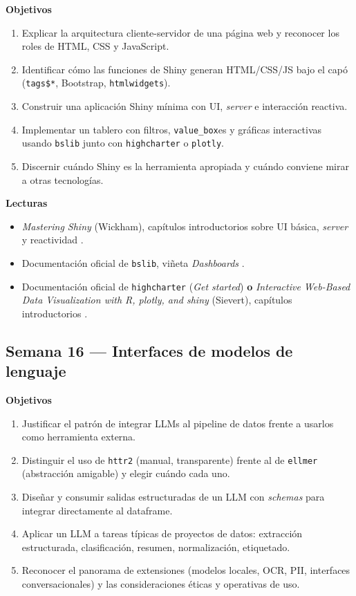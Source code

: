 \documentclass[11pt,letterpaper]{article}
\newcommand{\semanaSucinta}[2]{%
  \subsection*{\color{main}Semana #1 --- #2}%
}
\begin{document}
\noindent\textbf{Objetivos}
\begin{enumerate}[leftmargin=*, itemsep=1pt]
    \item Explicar la arquitectura cliente-servidor de una página web y reconocer los roles de HTML, CSS y JavaScript.
    \item Identificar cómo las funciones de Shiny generan HTML/CSS/JS bajo el capó (\texttt{tags\$*}, Bootstrap, \texttt{htmlwidgets}).
    \item Construir una aplicación Shiny mínima con UI, \textit{server} e interacción reactiva.
    \item Implementar un tablero con filtros, \texttt{value\_box}es y gráficas interactivas usando \texttt{bslib} junto con \texttt{highcharter} o \texttt{plotly}.
    \item Discernir cuándo Shiny es la herramienta apropiada y cuándo conviene mirar a otras tecnologías.
\end{enumerate}

\noindent\textbf{Lecturas}
\begin{itemize}[leftmargin=*, itemsep=1pt]
    \item \textit{Mastering Shiny} (Wickham), capítulos introductorios sobre UI básica, \textit{server} y reactividad \cite{wickham2021mastering-shiny}.
    \item Documentación oficial de \texttt{bslib}, viñeta \textit{Dashboards} \cite{bslib-docs}.
    \item Documentación oficial de \texttt{highcharter} (\textit{Get started}) \cite{kunst-highcharter} \textbf{o} \textit{Interactive Web-Based Data Visualization with R, plotly, and shiny} (Sievert), capítulos introductorios \cite{sievert-plotly}.
\end{itemize}

\semanaSucinta{16}{Interfaces de modelos de lenguaje}

\noindent\textbf{Objetivos}
\begin{enumerate}[leftmargin=*, itemsep=1pt]
    \item Justificar el patrón de integrar LLMs al pipeline de datos frente a usarlos como herramienta externa.
    \item Distinguir el uso de \texttt{httr2} (manual, transparente) frente al de \texttt{ellmer} (abstracción amigable) y elegir cuándo cada uno.
    \item Diseñar y consumir salidas estructuradas de un LLM con \textit{schemas} para integrar directamente al dataframe.
    \item Aplicar un LLM a tareas típicas de proyectos de datos: extracción estructurada, clasificación, resumen, normalización, etiquetado.
    \item Reconocer el panorama de extensiones (modelos locales, OCR, PII, interfaces conversacionales) y las consideraciones éticas y operativas de uso.
\end{enumerate}
\end{document}
